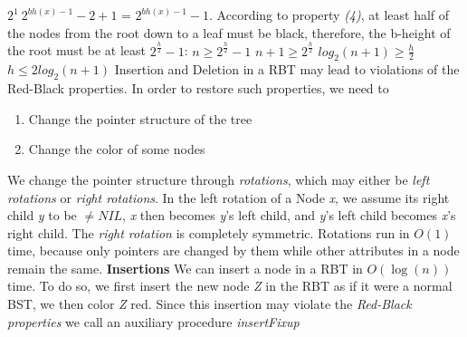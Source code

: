 \documentclass[12pt]{article}
\begin{document}
$2^1 \ 2^{bh(x) - 1} - 2 + 1$ = $2^{bh(x) - 1}- 1$. \newline \newline
According to property \textit{(4)}, at least half of the nodes from the root down to a leaf must be black,
therefore, the b-height of the root must be at least $2^{\frac{h}{2}} - 1$: \newline
$n \geq 2^{\frac{h}{2}} - 1$ \newline \newline
$n + 1 \geq 2^{\frac{h}{2}}$ \newline \newline
$log_2(n + 1) \geq \frac{h}{2}$ \newline \newline
\textbf{$h \leq 2 log_2(n + 1)$} \newline \newline \newline
Insertion and Deletion in a RBT may lead to violations of the Red-Black properties. \newline
In order to restore such properties, we need to
    \begin{enumerate}
        \item Change the pointer structure of the tree
        \item Change the color of some nodes
    \end{enumerate}
We change the pointer structure through \textit{rotations}, which may either be \textit{left rotations}
    or \textit{right rotations}. \newline
In the left rotation of a Node \textit{x}, we assume its right child \textit{y} to be $\neq NIL$, \textit{x} then
    becomes \textit{y}'s left child, and \textit{y}'s left child becomes \textit{x}'s right child. \newline
    The \textit{right rotation} is completely symmetric. \newline
Rotations run in $O(1)$ time, because only pointers are changed by them while other attributes in a node
    remain the same. \newline \newline \newline
\textbf{Insertions} \newline \newline
We can insert a node in a RBT in $O(\log(n))$ time.
To do so, we first insert the new node \textit{Z} in the RBT as if it were a normal BST, we then color \textit{Z} red.
Since this insertion may violate the \textit{Red-Black properties} we call an auxiliary procedure \textit{insertFixup}
\end{document}
